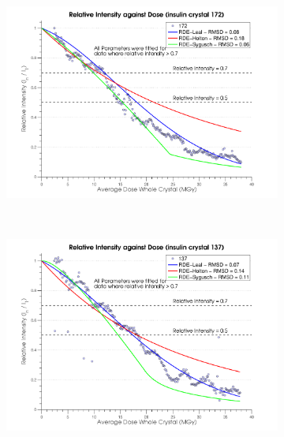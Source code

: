 \clearpage
\begin{figure}[H]
    \ContinuedFloat
    \centering
    \begin{subfigure}[b]{1\textwidth}
        \centering
        \includegraphics[width=\textwidth]{figures/dwd/relintplot172.pdf}
        \caption{}
        \label{Relative Intensity Plots - 172}
    \end{subfigure}
			\\
    \begin{subfigure}[b]{1\textwidth}
        \centering
        \includegraphics[width=\textwidth]{figures/dwd/relintplot137.pdf}
        \caption{}
        \label{Relative Intensity Plots - 137}
    \end{subfigure}
\end{figure}
